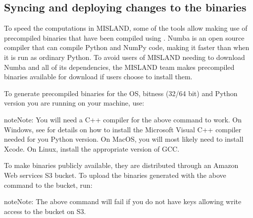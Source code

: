 \documentclass[letterpaper,10pt,english]{sphinxmanual}
\begin{document}
\subsection{Syncing and deploying changes to the binaries}
\label{\detokenize{Qgis_Plugin/plugin_development:syncing-and-deploying-changes-to-the-binaries}}
\sphinxAtStartPar
To speed the computations in MISLAND, some of the tools allow making use
of pre\sphinxhyphen{}compiled binaries that have been compiled using . Numba is an open source compiler that can compile
Python and NumPy code, making it faster than when it is run as ordinary Python.
To avoid users of MISLAND needing to download Numba and all of its
dependencies, the MISLAND team makes pre\sphinxhyphen{}compiled binaries available for
download if users choose to install them.

\sphinxAtStartPar
To generate pre\sphinxhyphen{}compiled binaries for the OS, bitness (32/64 bit) and Python
version you are running on your machine, use:

\begin{sphinxVerbatim}[commandchars=\\\{\}]
 
\end{sphinxVerbatim}

\begin{sphinxadmonition}{note}{Note:}
\sphinxAtStartPar
You will need a C++ compiler for the above command to work. On
Windows, see 
for details on how to
install the Microsoft Visual C++ compiler needed for you Python version. On
MacOS, you will most likely need to install Xcode. On Linux, install the
appropriate version of GCC.
\end{sphinxadmonition}

\sphinxAtStartPar
To make binaries publicly available, they are distributed through an Amazon Web
services S3 bucket. To upload the binaries generated with the above command to
the bucket, run:

\begin{sphinxVerbatim}[commandchars=\\\{\}]
 
\end{sphinxVerbatim}

\begin{sphinxadmonition}{note}{Note:}
\sphinxAtStartPar
The above command will fail if you do not have keys allowing write
access to the  bucket on S3.
\end{sphinxadmonition}
\end{document}
